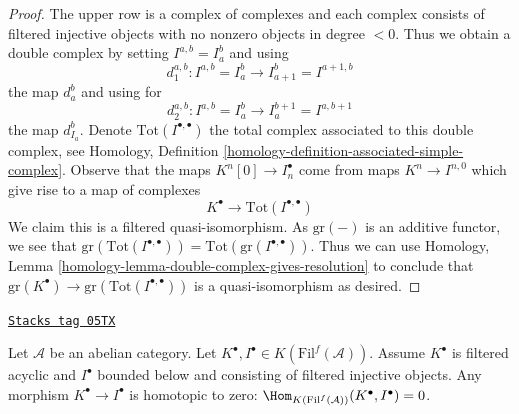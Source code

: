 \begin{proof}
The upper row is a complex of complexes and each complex consists of
filtered injective objects with no nonzero objects in degree $< 0$.
Thus we obtain a double complex by setting $I^{a, b} = I_a^b$ and using
$$
d_1^{a, b} : I^{a, b} = I_a^b \to I_{a + 1}^b = I^{a + 1, b}
$$
the map $d_a^b$ and using for
$$
d_2^{a, b} : I^{a, b} = I_a^b \to I_a^{b + 1} = I^{a, b + 1}
$$
the map $d_{I_a}^b$. Denote $\text{Tot}(I^{\bullet, \bullet})$
the total complex associated to this double complex, see
Homology, Definition \ref{homology-definition-associated-simple-complex}.
Observe that the maps $K^n[0] \to I_n^\bullet$ come from maps
$K^n \to I^{n, 0}$ which give rise to a map of complexes
$$
K^\bullet \longrightarrow \text{Tot}(I^{\bullet, \bullet})
$$
We claim this is a filtered quasi-isomorphism.
As $\text{gr}(-)$ is an additive functor, we see that
$\text{gr}(\text{Tot}(I^{\bullet, \bullet})) =
\text{Tot}(\text{gr}(I^{\bullet, \bullet}))$.
Thus we can use
Homology,
Lemma \ref{homology-lemma-double-complex-gives-resolution}
to conclude that
$\text{gr}(K^\bullet) \to \text{gr}(\text{Tot}(I^{\bullet, \bullet}))$
is a quasi-isomorphism as desired.
\end{proof}

\begin{lemma}
\label{derived-lemma-filtered-acyclic-is-zero}
\href{https://stacks.math.columbia.edu/tag/05TX}{\texttt{Stacks tag 05TX}}

Let $\mathcal{A}$ be an abelian category.
Let $K^\bullet, I^\bullet \in K(\text{Fil}^f(\mathcal{A}))$.
Assume $K^\bullet$ is filtered acyclic and
$I^\bullet$ bounded below and consisting of filtered injective objects.
Any morphism $K^\bullet \to I^\bullet$ is homotopic to zero:
$\Hom_{K(\text{Fil}^f(\mathcal{A}))}(K^\bullet, I^\bullet) = 0$.
\end{lemma}

